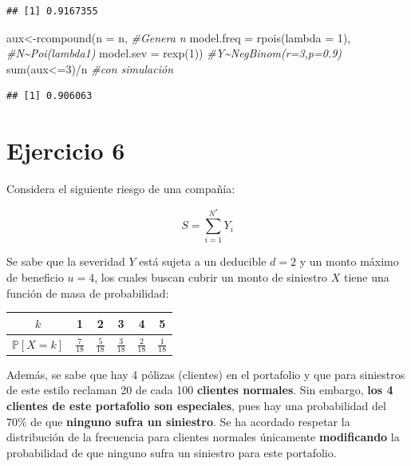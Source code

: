 \documentclass[
]{article}
\newenvironment{Shaded}{\begin{snugshade}}{\end{snugshade}}
\newcommand{\AttributeTok}[1]{\textcolor[rgb]{0.77,0.63,0.00}{#1}}
\newcommand{\CommentTok}[1]{\textcolor[rgb]{0.56,0.35,0.01}{\textit{#1}}}
\newcommand{\DecValTok}[1]{\textcolor[rgb]{0.00,0.00,0.81}{#1}}
\newcommand{\FunctionTok}[1]{\textcolor[rgb]{0.00,0.00,0.00}{#1}}
\newcommand{\NormalTok}[1]{#1}
\newcommand{\OtherTok}[1]{\textcolor[rgb]{0.56,0.35,0.01}{#1}}
\newcommand{\SpecialCharTok}[1]{\textcolor[rgb]{0.00,0.00,0.00}{#1}}
\begin{document}
\begin{verbatim}
## [1] 0.9167355
\end{verbatim}

\begin{Shaded}
\begin{Highlighting}[]
\NormalTok{aux}\OtherTok{\textless{}{-}}\FunctionTok{rcompound}\NormalTok{(}\AttributeTok{n =}\NormalTok{ n, }\CommentTok{\#Genera n}
                \AttributeTok{model.freq =} \FunctionTok{rpois}\NormalTok{(}\AttributeTok{lambda =} \DecValTok{1}\NormalTok{), }\CommentTok{\#N\textasciitilde{}Poi(lambda1)}
                \AttributeTok{model.sev =} \FunctionTok{rexp}\NormalTok{(}\DecValTok{1}\NormalTok{)) }\CommentTok{\#Y\textasciitilde{}NegBinom(r=3,p=0.9)}
\FunctionTok{sum}\NormalTok{(aux}\SpecialCharTok{\textless{}=}\DecValTok{3}\NormalTok{)}\SpecialCharTok{/}\NormalTok{n }\CommentTok{\#con simulación}
\end{Highlighting}
\end{Shaded}

\begin{verbatim}
## [1] 0.906063
\end{verbatim}

\hypertarget{ejercicio-6}{%
\section{Ejercicio 6}\label{ejercicio-6}}

Considera el siguiente riesgo de una compañía:

\[S=\sum_{i=1}^{N^*} Y_i\]

Se sabe que la severidad \(Y\) está sujeta a un deducible \(d=2\) y un
monto máximo de beneficio \(u=4\), los cuales buscan cubrir un monto de
siniestro \(X\) tiene una función de masa de probabilidad:

\vspace{-0.5cm}

\begin{center}
\begin{tabular}{|c|c|c|c|c|c|}
\hline
$k$ & 1 & 2 & 3 & 4 & 5   \\  \hline 
\rule[-1.5ex]{0pt}{4ex}$\mathbb{P}\left[X=k\right]$  & $\frac{7}{18}$ & $\frac{5}{18}$ & $\frac{3}{18}$ & $\frac{2}{18}$ & $\frac{1}{18}$ \\  \hline
\end{tabular}
\end{center}

Además, se sabe que hay 4 pólizas (clientes) en el portafolio y que para
siniestros de este estilo reclaman 20 de cada 100 \textbf{clientes
normales}. Sin embargo, \textbf{los 4 clientes de este portafolio son
especiales}, pues hay una probabilidad del 70\% de que \textbf{ninguno
sufra un siniestro}. Se ha acordado respetar la distribución de la
frecuencia para clientes normales únicamente \textbf{modificando} la
probabilidad de que ninguno sufra un siniestro para este portafolio.
\end{document}
